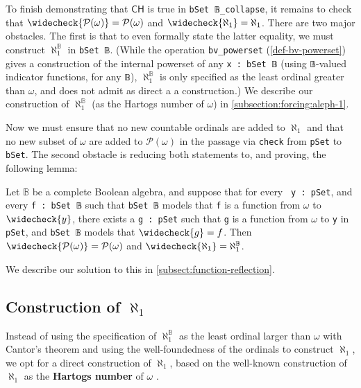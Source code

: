 \documentclass[sigplan,10pt,review, autoref,anonymous]{acmart}
\newcommand{\lil}{\lstinline}
\newcommand{\CH}{\mathsf{CH}}
\theoremstyle{definition}
\begin{document}
To finish demonstrating that \(\CH\) is true in \lil{bSet 𝔹_collapse}, it remains to check that \(\widecheck{\mathcal{P}(\omega)} = \mathcal{P}(\omega)\) and \(\widecheck{\aleph_1} = \aleph_1\). There are two major obstacles. The first is that to even formally state the latter equality, we must construct \(\aleph_1^{\mathbb{B}}\) in \lil{bSet 𝔹}. (While the operation \lil{bv_powerset} (\autoref{def-bv-powerset}) gives a construction of the internal powerset of any \lil{x : bSet 𝔹} (using \lil{𝔹}-valued indicator functions, for any \lil{𝔹}), \(\aleph_1^{\mathbb{B}}\) is only specified as the least ordinal greater than \(\omega\), and does not admit as direct a a construction.) We describe our construction of \(\aleph_1^{\mathbb{B}}\) (as the Hartogs number of \(\omega\)) in \autoref{subsection:forcing:aleph-1}.

Now we must ensure that no new countable ordinals are added to \(\aleph_1\) and that no new subset of \(\omega\) are added to \(\mathcal{P}(\omega)\) in the passage via \lil{check} from \lil{pSet} to \lil{bSet}. The second obstacle is reducing both statements to, and proving, the following lemma:

\begin{lemma}\label{lemma-function-reflect-suffices}
  Let \(\mathbb{B}\) be a complete Boolean algebra, and suppose that for every \lil{ y : pSet}, and every \lil{f : bSet 𝔹} such that \lil{bSet 𝔹} models that \lil{f} is a function from \(\omega\) to \(\widecheck{y}\), there exists a \lil{g : pSet} such that \lil{g} is a function from \(\omega\) to \lil{y} in \lil{pSet}, and \lil{bSet 𝔹} models that \(\widecheck{g} = f\). Then \(\widecheck{\mathcal{P}(\omega)} = \mathcal{P}(\omega)\) and \(\widecheck{\aleph_1} = \aleph_1^{\mathbb{B}}\).
\end{lemma}

We describe our solution to this in \autoref{subsect:function-reflection}.





\subsection{Construction of $\aleph_1$} \label{subsection:forcing:aleph-1}
Instead of using the specification of \(\aleph_1^{\mathbb{B}}\) as the least ordinal larger than \(\omega\) with Cantor's theorem and using the well-foundedness of the ordinals to construct \(\aleph_1\), we opt for a direct construction of \(\aleph_1\), based on the well-known construction of \(\aleph_1\) as the \textbf{Hartogs number} of \(\omega\) \cite{hartogs1915problem}.
\end{document}

